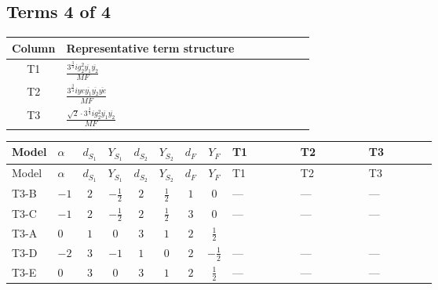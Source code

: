 \documentclass[8pt]{article}
\begin{document}
\begin{landscape}
\subsection*{Terms 4 of 4}
\begin{center}
\begin{tabular}{@{}c >{\raggedright\arraybackslash}p{0.82\linewidth}@{}}
\toprule
Column & Representative term structure \\
\midrule
T1 & \(\displaystyle \frac{3^{\frac{3}{4}} i g_{2}^{2} \overline{y_{1}} \overline{y_{2}}}{MF}\) \\
\midrule
T2 & \(\displaystyle \frac{3^{\frac{3}{4}} i ye \overline{y_{1}} \overline{y_{2}} \overline{ye}}{MF}\) \\
\midrule
T3 & \(\displaystyle \frac{\sqrt{2} \cdot 3^{\frac{3}{4}} i g_{2}^{2} \overline{y_{1}} \overline{y_{2}}}{MF}\) \\
\midrule
\bottomrule
\end{tabular}
\end{center}
\smallskip
\tiny
\begin{longtable}{@{}llcccccc >{\raggedright\arraybackslash}p{0.21\linewidth} >{\raggedright\arraybackslash}p{0.21\linewidth} >{\raggedright\arraybackslash}p{0.21\linewidth}@{}}
\toprule
Model & $\alpha$ & $d_{S_1}$ & $Y_{S_1}$ & $d_{S_2}$ & $Y_{S_2}$ & $d_F$ & $Y_F$ & T1 & T2 & T3 \\
\midrule
\endfirsthead
\toprule
Model & $\alpha$ & $d_{S_1}$ & $Y_{S_1}$ & $d_{S_2}$ & $Y_{S_2}$ & $d_F$ & $Y_F$ & T1 & T2 & T3 \\
\midrule
\endhead
T3-B & $-1$ & $2$ & $-\frac{1}{2}$ & $2$ & $\frac{1}{2}$ & $1$ & $0$ & --- & --- & --- \\
\midrule
T3-C & $-1$ & $2$ & $-\frac{1}{2}$ & $2$ & $\frac{1}{2}$ & $3$ & $0$ & --- & --- & --- \\
\midrule
T3-A & $0$ & $1$ & $0$ & $3$ & $1$ & $2$ & $\frac{1}{2}$ & \scriptsize\adjustbox{max width=\linewidth}{$\begin{gathered} \frac{25 \cdot 3^{\frac{3}{4}} i g_{2}^{2} \overline{y_{1}} \overline{y_{2}}}{24 MF}\end{gathered}$} & \scriptsize\adjustbox{max width=\linewidth}{$\begin{gathered} - \frac{3^{\frac{3}{4}} i ye \overline{y_{1}} \overline{y_{2}} \overline{ye}}{12 MF}\end{gathered}$} & \scriptsize\adjustbox{max width=\linewidth}{$\begin{gathered} \frac{\sqrt{2} \cdot 3^{\frac{3}{4}} i g_{2}^{2} \overline{y_{1}} \overline{y_{2}}}{6 MF}\end{gathered}$} \\
\midrule
T3-D & $-2$ & $3$ & $-1$ & $1$ & $0$ & $2$ & $-\frac{1}{2}$ & --- & --- & --- \\
\midrule
T3-E & $0$ & $3$ & $0$ & $3$ & $1$ & $2$ & $\frac{1}{2}$ & --- & --- & --- \\
\midrule
\bottomrule
\end{longtable}
\clearpage

\end{landscape}
\end{document}
